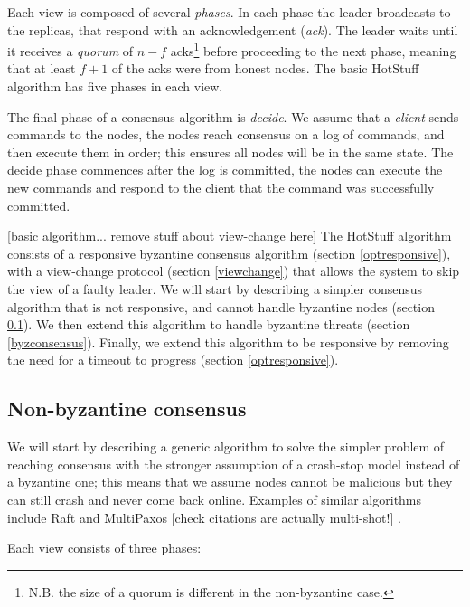 Each view is composed of several \textit{phases}. In each phase the leader broadcasts to the replicas, that respond with an acknowledgement (\textit{ack}). The leader waits until it receives a \textit{quorum} of $n - f$ acks\footnote{N.B. the size of a quorum is different in the non-byzantine case.} before proceeding to the next phase, meaning that at least $f + 1$ of the acks were from honest nodes. The basic HotStuff algorithm has five phases in each view.

The final phase of a consensus algorithm is \textit{decide}. We assume that a \textit{client} sends commands to the nodes, the nodes reach consensus on a log of commands, and then execute them in order; this ensures all nodes will be in the same state. The decide phase commences after the log is committed, the nodes can execute the new commands and respond to the client that the command was successfully committed.

[basic algorithm... remove stuff about view-change here]
The HotStuff algorithm consists of a responsive byzantine consensus algorithm (section \ref{optresponsive}), with a view-change protocol (section \ref{viewchange}) that allows the system to skip the view of a faulty leader. We will start by describing a simpler consensus algorithm that is not responsive, and cannot handle byzantine nodes (section \ref{nonbyzconsensus}). We then extend this algorithm to handle byzantine threats (section \ref{byzconsensus}). Finally, we extend this algorithm to be responsive by removing the need for a timeout to progress (section \ref{optresponsive}).

\subsection{Non-byzantine consensus} \label{nonbyzconsensus}
We will start by describing a generic algorithm to solve the simpler problem of reaching consensus with the stronger assumption of a crash-stop model instead of a byzantine one; this means that we assume nodes cannot be malicious but they can still crash and never come back online. Examples of similar algorithms include Raft \cite{ongaro_search_nodate} and MultiPaxos [check citations are actually multi-shot!] \cite{lamport_part-time_1998}\cite{lamport_paxos_2001}.

Each view consists of three phases:

